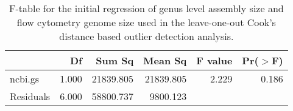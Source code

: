 \begin{table}[ht]
\centering
\begin{tabular}{lrrrrr}
  \hline
 & Df & Sum Sq & Mean Sq & F value & Pr($>$F) \\ 
  \hline
ncbi.gs     & 1.000 & 21839.805 & 21839.805 & 2.229 & 0.186 \\ 
  Residuals   & 6.000 & 58800.737 & 9800.123 &  &  \\ 
   \hline
\end{tabular}
\caption{F-table for the initial regression of genus level assembly size and flow cytometry genome size used in the leave-one-out Cook's distance based outlier detection analysis.} 
\label{tab:wc_apg_vec}
\end{table}
